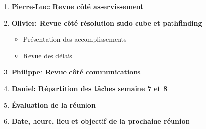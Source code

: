 \documentclass[12pt]{ULojpv}
\begin{document}
\begin{enumerate}
\begin{itemize}
   \end{itemize}
   \item\textbf{Pierre-Luc: Revue côté asservissement}
   \item\textbf{Olivier: Revue côté résolution sudo cube et pathfinding}
   \begin{itemize}
   \item Présentation des accomplissements
   \item Revue des délais
   \end{itemize}
   \item \textbf{Philippe: Revue côté communications}
   \item \textbf{Daniel: Répartition des tâches semaine 7 et 8}
   \item \textbf{Évaluation de la réunion}
   \item \textbf{Date, heure, lieu et objectif de la prochaine réunion}
\end{enumerate}
\end{document}
